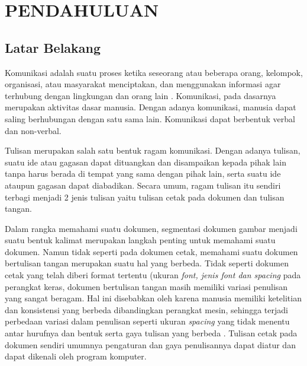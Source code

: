 
\chapter{PENDAHULUAN}
\label{chap:pendahuluan}


\section{Latar Belakang}
\label{sec:latarbelakang}

Komunikasi adalah suatu proses ketika seseorang atau beberapa orang, kelompok, organisasi, atau masyarakat menciptakan, dan menggunakan informasi agar terhubung dengan lingkungan dan orang lain \citep*{ruben2006communication}. Komunikasi, pada dasarnya merupakan aktivitas dasar manusia. Dengan adanya komunikasi, manusia dapat saling berhubungan dengan satu sama lain. Komunikasi dapat berbentuk verbal dan non-verbal. \par

Tulisan merupakan salah satu bentuk ragam komunikasi. Dengan adanya tulisan, suatu ide atau gagasan dapat dituangkan dan disampaikan kepada pihak lain tanpa harus berada di tempat yang sama dengan pihak lain, serta suatu ide ataupun gagasan dapat diabadikan. Secara umum, ragam tulisan itu sendiri terbagi menjadi 2 jenis tulisan yaitu tulisan cetak pada dokumen dan tulisan tangan.\par

Dalam rangka memahami suatu dokumen, segmentasi dokumen gambar menjadi suatu bentuk kalimat merupakan langkah penting untuk memahami suatu dokumen. Namun tidak seperti pada dokumen cetak, memahami suatu dokumen bertulisan tangan merupakan suatu hal yang berbeda. Tidak seperti dokumen cetak yang telah diberi format tertentu (ukuran \textit{font, \textnormal{jenis} font \textnormal{dan} spacing} pada perangkat keras, dokumen bertulisan tangan masih memiliki variasi penulisan yang sangat beragam. Hal ini disebabkan oleh karena manusia memiliki ketelitian dan konsistensi yang berbeda dibandingkan perangkat mesin, sehingga terjadi perbedaan variasi dalam penulisan seperti ukuran \textit{spacing} yang tidak menentu antar hurufnya dan bentuk serta gaya tulisan yang berbeda \citep*{ryu2015word}. Tulisan cetak pada dokumen sendiri umumnya pengaturan dan gaya penulisannya dapat diatur dan dapat dikenali oleh program komputer.\par


